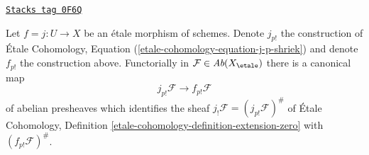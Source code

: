 \begin{lemma}
\label{more-etale-lemma-finite-support-etale-shriek}
\href{https://stacks.math.columbia.edu/tag/0F6Q}{\texttt{Stacks tag 0F6Q}}

Let $f = j : U \to X$ be an \'etale morphism of schemes. Denote $j_{p!}$
the construction of \'Etale Cohomology, Equation
(\ref{etale-cohomology-equation-j-p-shriek})
and denote $f_{p!}$ the construction above. Functorially in
$\mathcal{F} \in \textit{Ab}(X_\etale)$ there is a canonical map
$$
j_{p!}\mathcal{F} \longrightarrow f_{p!}\mathcal{F}
$$
of abelian presheaves which identifies the sheaf
$j_!\mathcal{F} = (j_{p!}\mathcal{F})^\#$ of \'Etale Cohomology,
Definition \ref{etale-cohomology-definition-extension-zero}
with $(f_{p!}\mathcal{F})^\#$.
\end{lemma}

